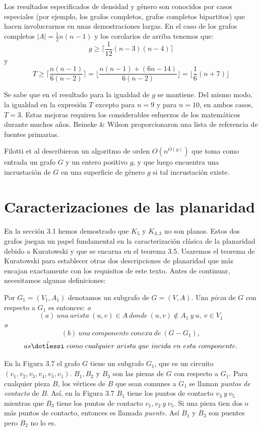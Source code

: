 \documentclass[10pt,a5paper]{book}
\begin{document}
Los resultados especificados de densidad y género son conocidos por casos especiales (por ejemplo, los grafos completos, grafos completos bipartitos) que hacen involucrarnos en unas demostraciones largas. En el caso de los grafos completos $|A| = \frac{1}{2}n(n-1)$ y los corolarios de arriba tenemos que:
\[ g \ge \bigg\lceil \frac{1}{12}(n - 3)(n - 4)\bigg\rceil \]
y
\[ T \ge \bigg\lceil \frac{n(n-1)}{6(n-2)}\bigg\rceil = \bigg\lfloor \frac{n(n-1) + (6n-14)}{6(n-2)}\bigg\rfloor = \bigg\lfloor \frac{1}{6}(n + 7)\bigg\rfloor \]

Se sabe que en el resultado para la igualdad de $g$ se mantiene. Del mismo modo, la igualdad en la expresión $T$ excepto para $n = 9$ y para $n = 10$, en ambos casos, $T = 3$. Estas mejoras requiren los considerables esfuerzos de los matemáticos durante muchos años. Beineke \& Wilson\cite{e} proporcionaron una lista de referencia de fuentes primarias.

Filotti et al\cite{f} describieron un algoritmo de orden $O(n^{O(g)})$ que toma como entrada un grafo $G$ y un entero positivo $g$, y que luego encuentra una incrustación de $G$ en una superficie de género $g$ si tal incrustación existe.

\section{Caracterizaciones de las planaridad}
En la sección 3.1 hemos demostrado que $K_5$ y $K_{3,3}$ no son planos. Estos dos grafos juegan un papel fundamental en la caracterización clásica de la planaridad debido a Kuratowski y que se encarna en el teorema 3.5. Usaremos el teorema de Kuratowski para establecer otras dos descripciones de planaridad que más encajan exactamente con los requisitos de este texto. Antes de continuar, necesitamos algunas definiciones:

Por $G_1 = (V_1,A_1)$ denotamos un subgrafo de $G = (V,A)$. Una \emph{pieza} de $G$ con respecto a $G_1$ es entonces:
\emph{o}
\[(a)\ una\ arista\ (u,v) \in A\ donde\ (u,v) \notin A_1\ y\ u,\ v \in V_1 \]
\emph{o}
\[(b)\ una\ componente\ conexa\ de\ (G - G_1),\] 
\[as\acute{\dotlessi}\ como\ cualquier\ arista\ que\ incida\ en\ esta\ componente. \] 

En la Figura 3.7 el grafo $G$ tiene un subgrafo $G_1$, que es un circuito $(v_1, v_2, v_3, v_4, v_5, v_1)$. $B_1, B_2$ y $B_3$ son las piezas de $G$ con respecto a $G_1$. Para cualquier pieza $B$, los vértices de $B$ que sean comunes a $G_1$ se llaman \emph{puntos de contacto} de $B$. Así, en la Figura 3.7 $B_1$ tiene los puntos de contacto $v_3\ y\ v_5$ mientras que $B_3$ tiene los puntos de contacto $v_1, v_2\ y\ v_5$. Si una pieza tien dos o más puntos de contacto, entonces es llamada \emph{puente}. Así $B_1$ y $B_3$ son puentes pero $B_2$ no lo es.
\end{document}
